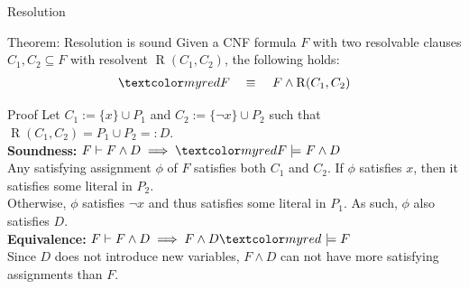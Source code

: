 \documentclass[t]{sdqbeamer}
\begin{document}
\begin{frame}{Resolution}
	\begin{block}{Theorem: Resolution is sound}
		Given a CNF formula $F$ with two resolvable clauses $C_1, C_2 \subseteq F$ with resolvent $\operatorname{R}(C_1,C_2)$, the following holds:
		\vspace*{-1ex}
		\begin{align*}
			\highlo{F \quad \equiv~} \quad F \land \operatorname{R}(C_1,C_2)
		\end{align*}
	\end{block}
	
	\pause
	\begin{block}{Proof}
		Let $C_1 := \{ x \} \cup P_1$ and $C_2 := \{ \lnot x \} \cup P_2$ such that $\operatorname{R}(C_1,C_2) = P_1 \cup P_2 =: D$.\\[1ex]
		
		\textbf{Soundness:} $F \vdash F \land D \implies \highlo{F \models~} F \land D$ \\[.5ex]
		\pause
		Any satisfying assignment $\phi$ of $F$ satisfies both $C_1$ and $C_2$.
		If $\phi$ satisfies $x$, then it satisfies some literal in $P_2$.\\
		Otherwise, $\phi$ satisfies $\lnot x$ and thus satisfies some literal in $P_1$.
		As such, $\phi$ also satisfies $D$.\\[1ex]
		\pause
		\textbf{Equivalence:} $F \vdash F \land D \implies F \land D \highlo{~\models F}$ \\[.5ex]
		\pause
		Since $D$ does not introduce new variables, $F \wedge D$ can not have more satisfying assignments than $F$.
	\end{block}
\end{frame}
\end{document}
